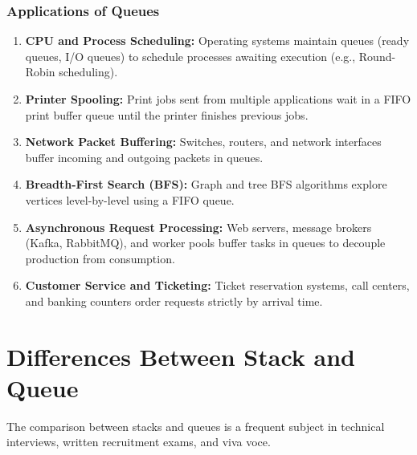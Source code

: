 \subsubsection{Applications of Queues}
\begin{enumerate}
    \item \textbf{CPU and Process Scheduling:} Operating systems maintain queues (ready queues, I/O queues) to schedule processes awaiting execution (e.g., Round-Robin scheduling).
    \item \textbf{Printer Spooling:} Print jobs sent from multiple applications wait in a FIFO print buffer queue until the printer finishes previous jobs.
    \item \textbf{Network Packet Buffering:} Switches, routers, and network interfaces buffer incoming and outgoing packets in queues.
    \item \textbf{Breadth-First Search (BFS):} Graph and tree BFS algorithms explore vertices level-by-level using a FIFO queue.
    \item \textbf{Asynchronous Request Processing:} Web servers, message brokers (Kafka, RabbitMQ), and worker pools buffer tasks in queues to decouple production from consumption.
    \item \textbf{Customer Service and Ticketing:} Ticket reservation systems, call centers, and banking counters order requests strictly by arrival time.
\end{enumerate}

\section{Differences Between Stack and Queue}

The comparison between stacks and queues is a frequent subject in technical interviews, written recruitment exams, and viva voce.

